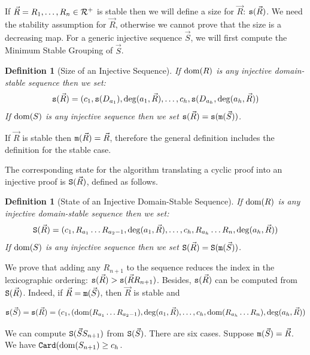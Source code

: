 \documentclass{lmcs}
\newtheorem{definition}[theorem]{Definition}
\begin{document}
If $\vec{R} = R_1, \ldots, R_n \in {\mathcal R}^+$ is stable then we will define a size for $\vec{R}$: 
${\tt s}(\vec{R})$. We need the stability assumption for $\vec{R}$, 
otherwise we cannot prove that 
the size is a decreasing map. For a generic injective sequence $\vec{S}$, we will first compute
the Minimum Stable Grouping of $\vec{S}$.

\begin{definition}[Size of an Injective Sequence]
If ${\rm dom}(R)$ is any injective domain-stable sequence then we set:
$$
{\tt s}(\vec{R}) 
= 
(c_1, {\tt s}(D_{a_1}), \deg(a_1,\vec{R}), \ldots,c_h,{\tt s}(D_{a_h},\deg(a_h,\vec{R}))
$$
If ${\rm dom}(S)$ is any injective sequence then we set ${\tt s}(\vec{R}) = {\tt s}({\tt m}(\vec{S}))$.
\end{definition}

If $\vec{R}$ is stable then ${\tt m}(\vec{R}) = \vec{R}$, therefore 
the general definition includes the definition for the stable case.

The corresponding state for the algorithm translating a cyclic proof into an
injective proof is ${\tt S}(\vec{R})$, defined as follows.

\begin{definition}[State of an Injective Domain-Stable Sequence]
If ${\rm dom}(R)$ is any injective domain-stable sequence then we set:
$$
{\tt S}(\vec{R})
=
(c_1, R_{a_1}\ldots R_{a_2-1}, \deg(a_1,\vec{R}), 
\ldots,
c_h, R_{a_h}\ldots R_{n}, \deg(a_h,\vec{R}))
$$
If ${\rm dom}(S)$ is any injective sequence then we set ${\tt S}(\vec{R}) = {\tt S}({\tt m}(\vec{S}))$.
\end{definition}
 
We prove that adding any $R_{n+1}$ to the sequence reduces the index in the 
lexicographic ordering: ${\tt s}(\vec{R}) > {\tt s}(\vec{R}R_{n+1}) $. Besides,
${\tt s}(\vec{R})$ can be computed from ${\tt S}(\vec{R})$. Indeed, if
$\vec{R} = {\tt m}(\vec{S})$, then $\vec{R}$ is stable and

$$
{\tt s}(\vec{S})
=
{\tt s}(\vec{R})
=
(
 c_1,({\rm dom}(R_{a_1}\ldots R_{a_2-1}), \deg(a_1,\vec{R}), 
 \ldots,
 c_h,{\rm dom}(R_{a_h}\ldots R_{n}), \deg(a_h,\vec{R})
 )
$$

We can compute ${\tt S}(\vec{S}S_{n+1})$ from ${\tt S}(\vec{S})$.
There are six cases. Suppose ${\tt m}(\vec{S}) = \vec{R}$.
We have ${\tt Card}({\rm dom}(S_{n+1}) \ge c_h$.
\end{document}
